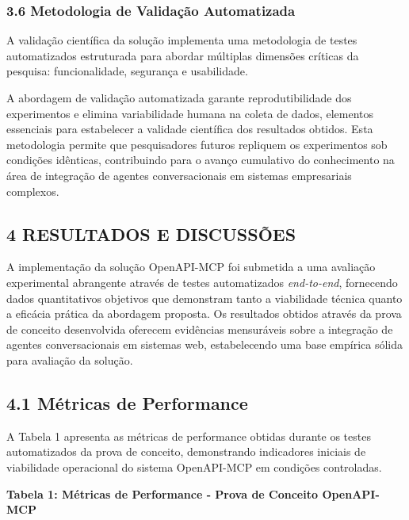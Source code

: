 \documentclass[
]{article}
\begin{document}
\subsubsection{3.6 Metodologia de Validação
Automatizada}\label{metodologia-de-validauxe7uxe3o-automatizada}

A validação científica da solução implementa uma metodologia de testes
automatizados estruturada para abordar múltiplas dimensões críticas da
pesquisa: funcionalidade, segurança e usabilidade.

A abordagem de validação automatizada garante reprodutibilidade dos
experimentos e elimina variabilidade humana na coleta de dados,
elementos essenciais para estabelecer a validade científica dos
resultados obtidos. Esta metodologia permite que pesquisadores futuros
repliquem os experimentos sob condições idênticas, contribuindo para o
avanço cumulativo do conhecimento na área de integração de agentes
conversacionais em sistemas empresariais complexos.

\subsection{4 RESULTADOS E DISCUSSÕES}\label{resultados-e-discussuxf5es}

A implementação da solução OpenAPI-MCP foi submetida a uma avaliação
experimental abrangente através de testes automatizados
\emph{end-to-end}, fornecendo dados quantitativos objetivos que
demonstram tanto a viabilidade técnica quanto a eficácia prática da
abordagem proposta. Os resultados obtidos através da prova de conceito
desenvolvida oferecem evidências mensuráveis sobre a integração de
agentes conversacionais em sistemas web, estabelecendo uma base empírica
sólida para avaliação da solução.

\subsection{4.1 Métricas de
Performance}\label{muxe9tricas-de-performance}

A Tabela 1 apresenta as métricas de performance obtidas durante os
testes automatizados da prova de conceito, demonstrando indicadores
iniciais de viabilidade operacional do sistema OpenAPI-MCP em condições
controladas.

\textbf{Tabela 1: Métricas de Performance - Prova de Conceito
OpenAPI-MCP}
\end{document}
